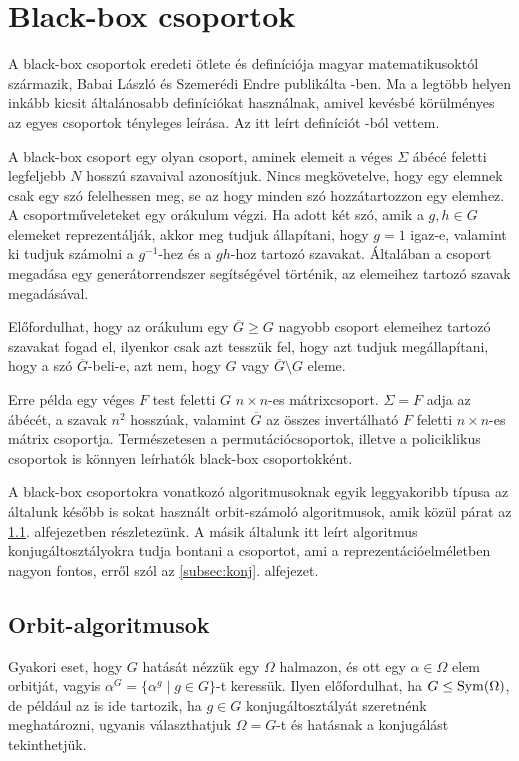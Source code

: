 \section{Black-box csoportok}
\label{sec:blackbox}
A black-box csoportok eredeti ötlete és definíciója magyar matematikusoktól származik,
Babai László és Szemerédi Endre publikálta \cite{BS84}-ben.
Ma a legtöbb helyen inkább kicsit általánosabb definíciókat használnak, amivel kevésbé körülményes az
egyes csoportok tényleges leírása. Az itt leírt definíciót \cite{Ser03}-ból vettem.

A black-box csoport egy olyan csoport,
aminek elemeit a véges $\Sigma$ ábécé feletti legfeljebb $N$ hosszú szavaival azonosítjuk.
Nincs megkövetelve, hogy egy elemnek csak egy szó felelhessen meg, se az hogy minden szó hozzátartozzon
egy elemhez.
A csoportműveleteket egy orákulum végzi.
Ha adott két szó, amik a $g, h\in G$ elemeket reprezentálják,
akkor meg tudjuk állapítani, hogy $g=1$ igaz-e,
valamint ki tudjuk számolni a $g^{-1}$-hez és a $gh$-hoz tartozó szavakat.
Általában a csoport megadása egy generátorrendszer segítségével történik, az elemeihez tartozó szavak megadásával.

Előfordulhat, hogy az orákulum egy $\overline{G} \ge G$ nagyobb csoport elemeihez tartozó szavakat fogad el,
ilyenkor csak azt tesszük fel, hogy azt tudjuk megállapítani, hogy a szó $\overline{G}$-beli-e,
azt nem, hogy $G$ vagy $\overline{G}\setminus G$ eleme.

Erre példa egy véges $F$ test feletti $G$ $n\times n$-es mátrixcsoport.
$\Sigma=F$ adja az ábécét, a szavak $n^2$ hosszúak,
valamint $\overline{G}$ az összes invertálható $F$ feletti $n\times n$-es mátrix csoportja.
Természetesen a permutációcsoportok, illetve a policiklikus csoportok is könnyen leírhatók black-box csoportokként.

A black-box csoportokra vonatkozó algoritmusoknak  egyik leggyakoribb típusa az általunk később is sokat használt
orbit-számoló algoritmusok, amik közül párat az \ref{subsec:orbit}. alfejezetben részletezünk.
A másik általunk itt leírt algoritmus konjugáltosztályokra tudja bontani a csoportot, ami a reprezentációelméletben nagyon fontos,
erről szól az \ref{subsec:konj}. alfejezet.

\subsection{Orbit-algoritmusok}
\label{subsec:orbit}
Gyakori eset, hogy $G$ hatását nézzük egy $\Omega$ halmazon, és ott egy $\alpha\in\Omega$ elem orbitját,
vagyis $\alpha^G = \{ \alpha^g \mid g \in G \}$-t keressük. Ilyen előfordulhat, ha $G \le \operatorname{Sym}(\Omega)$,
de például az is ide tartozik, ha $g \in G$ konjugáltosztályát szeretnénk meghatározni, ugyanis választhatjuk
$\Omega=G$-t és hatásnak a konjugálást tekinthetjük.

